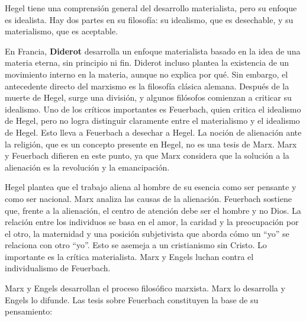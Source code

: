 \documentclass[
  letterpaper,
  DIV=11,
  numbers=noendperiod]{scrartcl}
\begin{document}
Hegel tiene una comprensión general del desarrollo materialista, pero su
enfoque es idealista. Hay dos partes en su filosofía: su idealismo, que
es desechable, y su materialismo, que es aceptable.

En Francia, \textbf{Diderot} desarrolla un enfoque materialista basado
en la idea de una materia eterna, sin principio ni fin. Diderot incluso
plantea la existencia de un movimiento interno en la materia, aunque no
explica por qué. Sin embargo, el antecedente directo del marxismo es la
filosofía clásica alemana. Después de la muerte de Hegel, surge una
división, y algunos filósofos comienzan a criticar su idealismo. Uno de
los críticos importantes es Feuerbach, quien critica el idealismo de
Hegel, pero no logra distinguir claramente entre el materialismo y el
idealismo de Hegel. Esto lleva a Feuerbach a desechar a Hegel. La noción
de alienación ante la religión, que es un concepto presente en Hegel, no
es una tesis de Marx. Marx y Feuerbach difieren en este punto, ya que
Marx considera que la solución a la alienación es la revolución y la
emancipación.

Hegel plantea que el trabajo aliena al hombre de su esencia como ser
pensante y como ser nacional. Marx analiza las causas de la alienación.
Feuerbach sostiene que, frente a la alienación, el centro de atención
debe ser el hombre y no Dios. La relación entre los individuos se basa
en el amor, la caridad y la preocupación por el otro, la maternidad y
una posición subjetivista que aborda cómo un ``yo'' se relaciona con
otro ``yo''. Esto se asemeja a un cristianismo sin Cristo. Lo importante
es la crítica materialista. Marx y Engels luchan contra el
individualismo de Feuerbach.

Marx y Engels desarrollan el proceso filosófico marxista. Marx lo
desarrolla y Engels lo difunde. Las tesis sobre Feuerbach constituyen la
base de su pensamiento:
\end{document}
